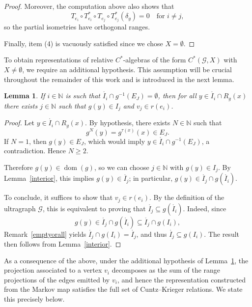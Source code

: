 \documentclass[12pt, reqno]{amsart}
\newtheorem{lemma}[theorem]{Lemma}
\theoremstyle{definition}
\theoremstyle{remark}
\numberwithin{equation}{section}
\begin{document}
\begin{proof}
Moreover, the computation above also shows that 
\[
T_{e_i} \circ T_{e_i}^* \circ T_{e_j} \circ T_{e_j}^*(\delta_y) = 0
\quad \text{for } i \neq j,
\]
so the partial isometries have orthogonal ranges.  

Finally, item (4) is vacuously satisfied since we chose $X = \emptyset$.  
\end{proof}




To obtain representations of relative $C^*$-algebras of the form 
$C^*(\mathcal{G},X)$ with $X \neq \emptyset$, 
we require an additional hypothesis. 
This assumption will be crucial throughout the remainder of this work 
and is introduced in the next lemma.

\begin{lemma}\label{lemaprincipalmarkov}
     If $i \in \mathbb{N}$ is such that 
     $\mathring{I_i} \cap g^{-1}(E_J) = \emptyset$, 
     then for all $y \in \mathring{I_i} \cap R_g(x)$ 
     there exists $j \in \mathbb{N}$ such that 
     $g(y) \in I_j$ and $v_j \in r(e_i)$.
\end{lemma}

\begin{proof}
Let $y \in \mathring{I_i} \cap R_g(x)$.  
By hypothesis, there exists $N \in \mathbb{N}$ such that 
\[
g^N(y) = g^{\tau(x)}(x) \in E_J.
\]
If $N=1$, then $g(y) \in E_J$, which would imply 
$y \in \mathring{I_i} \cap g^{-1}(E_J)$, a contradiction. 
Hence $N \geq 2$.  

Therefore $g(y) \in \operatorname{dom}(g)$, so we can choose 
$j \in \mathbb{N}$ with $g(y) \in I_j$. 
By Lemma~\ref{interior}, this implies $g(y) \in \mathring{I_j}$; 
in particular, $g(y) \in \mathring{I_j} \cap g(\mathring{I_i})$.

To conclude, it suffices to show that $v_j \in r(e_i)$.  
By the definition of the ultragraph $\mathcal{G}$, 
this is equivalent to proving that 
$\mathring{I_j} \subseteq g(\mathring{I_i})$.  
Indeed, since 
\[
g(y) \in \mathring{I_j} \cap g(\mathring{I_i}) 
   \subseteq \mathring{I_j} \cap g(I_i),
\] 
Remark~\ref{emptyorall} yields 
$\mathring{I_j} \cap g(I_i) = \mathring{I_j}$, 
and thus $\mathring{I_j} \subseteq g(I_i)$.  
The result then follows from Lemma~\ref{interior}.
\end{proof}

As a consequence of the above, under the additional hypothesis of 
    Lemma~\ref{lemaprincipalmarkov}, 
    the projection associated to a vertex $v_i$ decomposes as the sum of the 
    range projections of the edges emitted by $v_i$, and hence the representation constructed from the Markov map satisfies the full 
    set of Cuntz--Krieger relations. We state this precisely below.
\end{document}
